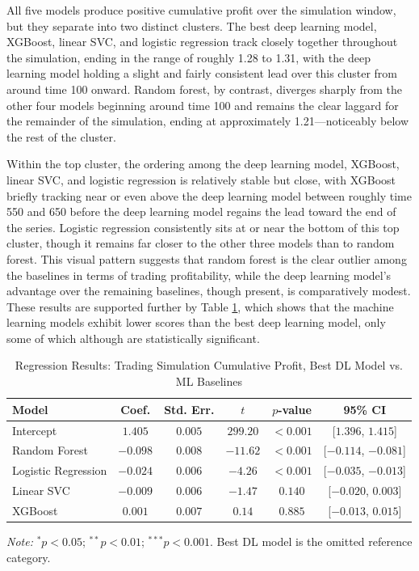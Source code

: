 \documentclass[stu,floatsintext]{apa7}
\begin{document}
All five models produce positive cumulative profit over the simulation window, but they separate into two distinct clusters. The best deep learning model, XGBoost, linear SVC, and logistic regression track closely together throughout the simulation, ending in the range of roughly 1.28 to 1.31, with the deep learning model holding a slight and fairly consistent lead over this cluster from around time 100 onward. Random forest, by contrast, diverges sharply from the other four models beginning around time 100 and remains the clear laggard for the remainder of the simulation, ending at approximately 1.21---noticeably below the rest of the cluster.

Within the top cluster, the ordering among the deep learning model, XGBoost, linear SVC, and logistic regression is relatively stable but close, with XGBoost briefly tracking near or even above the deep learning model between roughly time 550 and 650 before the deep learning model regains the lead toward the end of the series. Logistic regression consistently sits at or near the bottom of this top cluster, though it remains far closer to the other three models than to random forest. This visual pattern suggests that random forest is the clear outlier among the baselines in terms of trading profitability, while the deep learning model's advantage over the remaining baselines, though present, is comparatively modest. These results are supported further by Table \ref{tab:trading_sim_baseline_regression}, which shows that the machine learning models exhibit lower scores than the best deep learning model, only some of which although are statistically significant.
\medskip
\medskip

\begin{table}[htbp]
\centering
\caption{Regression Results: Trading Simulation Cumulative Profit, Best DL Model vs. ML Baselines}
\label{tab:trading_sim_baseline_regression}
\begin{tabular}{lccccc}
\toprule
Model & Coef. & Std. Err. & $t$ & $p$-value & 95\% CI \\
\midrule
Intercept              & $1.405$  & $0.005$ & $299.20$ & $<0.001$\rlap{$^{***}$} & [$1.396$, $1.415$] \\
Random Forest           & $-0.098$ & $0.008$ & $-11.62$ & $<0.001$\rlap{$^{***}$} & [$-0.114$, $-0.081$] \\
Logistic Regression      & $-0.024$ & $0.006$ & $-4.26$  & $<0.001$\rlap{$^{***}$} & [$-0.035$, $-0.013$] \\
Linear SVC               & $-0.009$ & $0.006$ & $-1.47$  & $0.140$                & [$-0.020$, $0.003$] \\
XGBoost                  & $0.001$  & $0.007$ & $0.14$   & $0.885$                & [$-0.013$, $0.015$] \\
\bottomrule
\end{tabular}
\begin{flushleft}
\footnotesize
\textit{Note:} $^{*}p<0.05$; $^{**}p<0.01$; $^{***}p<0.001$. Best DL model is the omitted reference category.
\end{flushleft}
\end{table}
\end{document}
